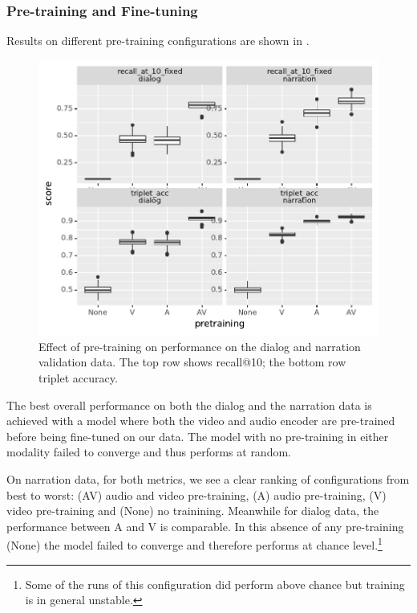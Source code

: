 \subsubsection{Pre-training and Fine-tuning}
Results on different pre-training configurations are shown in
.
\begin{figure}[htb]
	\centering
	\includegraphics[width=\columnwidth]{results/ablations/pretraining.pdf}
	\caption{Effect of pre-training on performance on the dialog
          and narration validation data. The top row shows recall@10;
          the bottom row triplet accuracy.}
	\label{fig:pretraining}
      \end{figure}

The best overall performance on both the dialog and the narration data is 
achieved with a model where both the video and audio encoder are pre-trained 
before being fine-tuned on our data. The model with no pre-training in
either modality failed to converge and thus performs at random.


On narration data, for both metrics, we see a clear ranking of
configurations from best to worst: (AV) audio and video pre-training,
(A) audio pre-training, (V) video pre-training and (None) no
trainining. Meanwhile for dialog data, the performance between A and V
is comparable. In this absence of any pre-training (None) the model failed
to converge and therefore performs at chance level.\footnote{Some of
  the runs of this configuration did perform above chance but
  training is in general unstable.}

